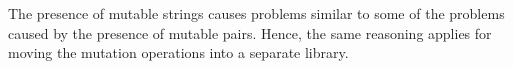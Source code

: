 \documentclass[twoside,twocolumn]{algol60}
\begin{document}
The presence of mutable strings causes problems similar to some of the
problems caused by the presence of mutable pairs.  Hence, the same
reasoning applies for moving the mutation operations into a separate
library.


\renewcommand{\bibname}{References}



\end{document}
